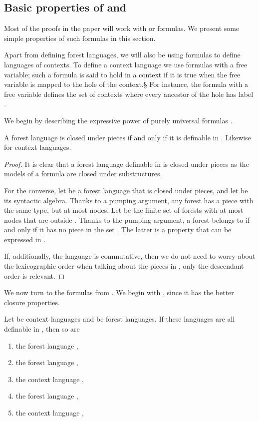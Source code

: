 \documentclass{LMCS}
\begin{document}
\subsection{Basic properties of \texorpdfstring{}{Pi1} and  \texorpdfstring{}{Sigma2}}
Most of the proofs in the paper will work with \Stwo or \Stwol formulas. We
present some simple properties of such formulas in this section.

Apart from defining forest languages, we will also be using formulas to define
languages of contexts. To define a context language we use formulas with a free
variable; such a formula is said to hold in a context if it is true when the
free variable is mapped to the hole of the context.§ For instance, the formula
 with a free variable  defines the set
of contexts where every ancestor of the hole has label .

We begin by describing the expressive power of  purely universal formulas .
\begin{lem}\label{lem:pi1-lemma}
  A forest language is closed under pieces if
  and only if it is definable in .  Likewise for
  context languages.
\end{lem}
\begin{proof}
  It is clear that a forest language definable in  is closed under
  pieces as the models of a  formula are closed under substructures.

  For the converse, let  be a forest language that is closed under pieces,
  and let  be its syntactic algebra.  Thanks to a
  pumping argument, any forest has a piece with the same type, but at most
   nodes.  Let  be the finite set of forests with at most
   nodes that are outside . Thanks to the pumping argument, a
  forest belongs to  if and only if it has no piece in the set . The
  latter is a property that can be expressed in .
  
  If, additionally, the language  is commutative, then we do not need
  to worry about the lexicographic order when talking about the pieces
  in , only the descendant order is relevant.
\end{proof}

We now turn to the formulas from . We begin  with \Stwol,
since it has the  better closure properties.
\begin{lem}\label{fact:simple-lex}
  Let  be context languages and  be forest languages. If
  these languages are all definable in \Stwol, then so are
\begin{enumerate}[\em(1)]
\item the forest language ,
\item the forest language ,
\item the context language ,
\item the forest language ,
\item the context language ,
\end{enumerate}
\end{lem}
\end{document}
